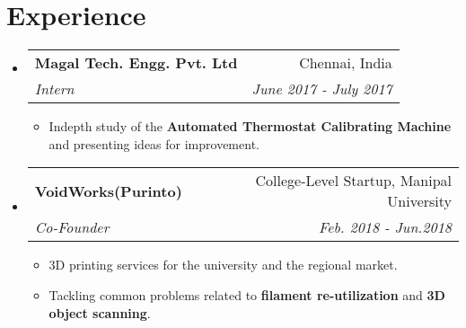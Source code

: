 \documentclass[letterpaper,11pt]{article}
\makeatletter
\newcommand{\resumeSubheading}[4]{
  \vspace{-1pt}\item
    \begin{tabular*}{0.97\textwidth}{l@{\extracolsep{\fill}}r}
      \textbf{#1} & #2 \\
      \textit{\small#3} & \textit{\small #4} \\
    \end{tabular*}\vspace{-5pt}
}
\newcommand{\resumeSubHeadingListStart}{\begin{itemize}[leftmargin=*]}
\newcommand{\resumeSubHeadingListEnd}{\end{itemize}}
\newcommand{\resumeItemListStart}{\begin{itemize}}
\newcommand{\resumeItemListEnd}{\end{itemize}\vspace{-5pt}}
\makeatother
\begin{document}

\section{Experience}
\resumeSubHeadingListStart

\resumeSubheading
{Magal Tech. Engg. Pvt. Ltd}{Chennai, India}
{Intern}{June 2017 - July 2017}
\resumeItemListStart
\item
{Indepth study of the \textbf{Automated Thermostat Calibrating Machine} and presenting ideas for improvement.}
\resumeItemListEnd


\resumeSubheading
{VoidWorks(Purinto)}{College-Level Startup, Manipal University}
{Co-Founder}{Feb. 2018 - Jun.2018}
\resumeItemListStart
\item
{3D printing services for the university and the regional market.}
\item 
{Tackling common problems related to \textbf{filament re-utilization} and \textbf{3D object scanning}.}
\resumeItemListEnd

\resumeSubHeadingListEnd
\end{document}
